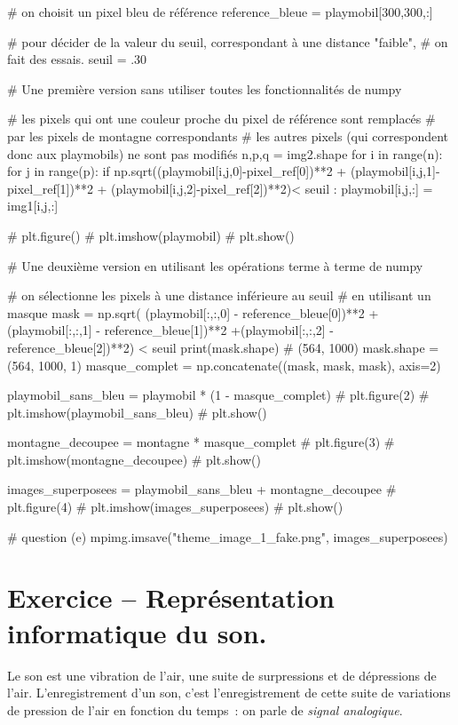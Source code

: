 \documentclass[10pt,fleqn]{article} %
\begin{document}
\begin{multicols}{2}
\begin{corrige}
\begin{python}
# on choisit un pixel bleu de référence
reference_bleue = playmobil[300,300,:]

# pour décider de la valeur du seuil, correspondant à une distance "faible",
# on fait des essais. 
seuil = .30

# Une première version sans utiliser toutes les fonctionnalités de numpy

# les pixels qui ont une couleur proche du pixel de référence sont remplacés
# par les pixels de montagne correspondants
# les autres pixels (qui correspondent donc aux playmobils) ne sont pas modifiés
n,p,q = img2.shape
for i in range(n):
    for j in range(p):
        if np.sqrt((playmobil[i,j,0]-pixel_ref[0])**2 + (playmobil[i,j,1]-pixel_ref[1])**2
                   + (playmobil[i,j,2]-pixel_ref[2])**2)< seuil :
            playmobil[i,j,:] = img1[i,j,:]

# plt.figure()
# plt.imshow(playmobil)
# plt.show()

# Une deuxième version en utilisant les opérations terme à terme de numpy

# on sélectionne les pixels à une distance inférieure au seuil
# en utilisant un masque
mask = np.sqrt( (playmobil[:,:,0] - reference_bleue[0])**2
               +(playmobil[:,:,1] - reference_bleue[1])**2
               +(playmobil[:,:,2] - reference_bleue[2])**2) < seuil
print(mask.shape)
# (564, 1000)
mask.shape = (564, 1000, 1)
masque_complet = np.concatenate((mask, mask, mask), axis=2)

playmobil_sans_bleu = playmobil * (1 - masque_complet)
# plt.figure(2)
# plt.imshow(playmobil_sans_bleu)
# plt.show()

montagne_decoupee = montagne * masque_complet
# plt.figure(3)
# plt.imshow(montagne_decoupee)
# plt.show()

images_superposees = playmobil_sans_bleu + montagne_decoupee
# plt.figure(4)
# plt.imshow(images_superposees)
# plt.show()

# question (e)
mpimg.imsave("theme_image_1_fake.png", images_superposees)
\end{python}
\end{corrige}
\else
\fi



\section*{Exercice -- Représentation informatique du son.}

\ifprof
\else
Le son est une vibration de l'air, une suite de surpressions et de
dépressions de l'air. L'enregistrement d'un son, c'est
l'enregistrement de cette suite de variations de pression de l'air en
fonction du temps~: on parle de \emph{signal analogique}.


\end{multicols}
\end{document}

